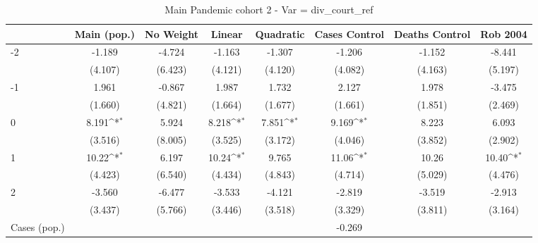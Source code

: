 \documentclass{article}
\begin{document}
{
\def\sym#1{\ifmmode^{#1}\else\(^{#1}\)\fi}
\begin{longtable}{l*{7}{c}}
\caption{Main Pandemic cohort 2 - Var = div\_court\_ref}\\
\hline\hline\endfirsthead\hline\endhead\hline\endfoot\endlastfoot
                &\multicolumn{1}{c}{Main (pop.)}&\multicolumn{1}{c}{No Weight}&\multicolumn{1}{c}{Linear}&\multicolumn{1}{c}{Quadratic}&\multicolumn{1}{c}{Cases Control}&\multicolumn{1}{c}{Deaths Control}&\multicolumn{1}{c}{Rob 2004}\\
\hline
-2              &   -1.189         &   -4.724         &   -1.163         &   -1.307         &   -1.206         &   -1.152         &   -8.441         \\
                &  (4.107)         &  (6.423)         &  (4.121)         &  (4.120)         &  (4.082)         &  (4.163)         &  (5.197)         \\
-1              &    1.961         &   -0.867         &    1.987         &    1.732         &    2.127         &    1.978         &   -3.475         \\
                &  (1.660)         &  (4.821)         &  (1.664)         &  (1.677)         &  (1.661)         &  (1.851)         &  (2.469)         \\
0               &    8.191\sym{*}  &    5.924         &    8.218\sym{*}  &    7.851\sym{*}  &    9.169\sym{*}  &    8.223         &    6.093         \\
                &  (3.516)         &  (8.005)         &  (3.525)         &  (3.172)         &  (4.046)         &  (3.852)         &  (2.902)         \\
1               &    10.22\sym{*}  &    6.197         &    10.24\sym{*}  &    9.765         &    11.06\sym{*}  &    10.26         &    10.40\sym{*}  \\
                &  (4.423)         &  (6.540)         &  (4.434)         &  (4.843)         &  (4.714)         &  (5.029)         &  (4.476)         \\
2               &   -3.560         &   -6.477         &   -3.533         &   -4.121         &   -2.819         &   -3.519         &   -2.913         \\
                &  (3.437)         &  (5.766)         &  (3.446)         &  (3.518)         &  (3.329)         &  (3.811)         &  (3.164)         \\
Cases (pop.)    &                  &                  &                  &                  &   -0.269         &                  &                  \\

\end{longtable}}
\end{document}
